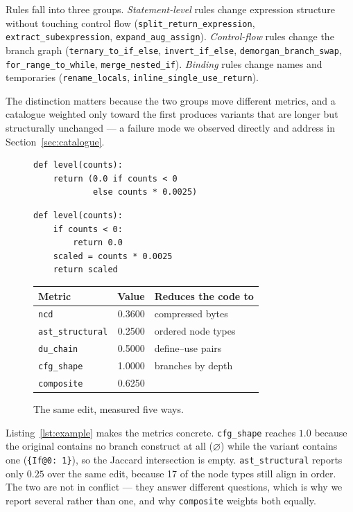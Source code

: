 \documentclass[10pt,twocolumn]{article}
\newcommand{\code}[1]{\texttt{\small #1}}
\begin{document}
Rules fall into three groups. \emph{Statement-level} rules change expression
structure without touching control flow (\code{split\_return\_expression},
\code{extract\_subexpression}, \code{expand\_aug\_assign}).
\emph{Control-flow} rules change the branch graph (\code{ternary\_to\_if\_else},
\code{invert\_if\_else}, \code{demorgan\_branch\_swap},
\code{for\_range\_to\_while}, \code{merge\_nested\_if}). \emph{Binding} rules
change names and temporaries (\code{rename\_locals},
\code{inline\_single\_use\_return}).

The distinction matters because the two groups move different metrics, and a
catalogue weighted only toward the first produces variants that are longer but
structurally unchanged --- a failure mode we observed directly and address in
Section~\ref{sec:catalogue}.

\begin{figure}[t]
\begin{lstlisting}[caption={Original (top) and variant (bottom) after
\code{ternary\_to\_if\_else} then \code{split\_return\_expression}.},
                   captionpos=b,label=lst:example]
def level(counts):
    return (0.0 if counts < 0
            else counts * 0.0025)
\end{lstlisting}
\vspace{-8pt}
\begin{lstlisting}
def level(counts):
    if counts < 0:
        return 0.0
    scaled = counts * 0.0025
    return scaled
\end{lstlisting}
\vspace{-4pt}
\centering
\small
\begin{tabular}{lrl}
\toprule
Metric & Value & Reduces the code to \\
\midrule
\code{ncd}            & 0.3600 & compressed bytes \\
\code{ast\_structural}& 0.2500 & ordered node types \\
\code{du\_chain}      & 0.5000 & define--use pairs \\
\code{cfg\_shape}     & 1.0000 & branches by depth \\
\midrule
\code{composite}      & 0.6250 & \\
\bottomrule
\end{tabular}
\caption{The same edit, measured five ways.}
\label{tab:example}
\end{figure}

Listing~\ref{lst:example} makes the metrics concrete. \code{cfg\_shape} reaches
$1.0$ because the original contains no branch construct at all
($\varnothing$) while the variant contains one (\code{\{If@0: 1\}}), so the
Jaccard intersection is empty. \code{ast\_structural} reports only $0.25$ over
the same edit, because 17 of the node types still align in order. The two are
not in conflict --- they answer different questions, which is why we report
several rather than one, and why \code{composite} weights both equally.
\end{document}
